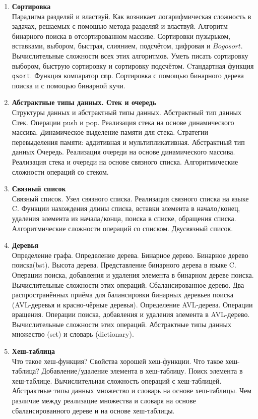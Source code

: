 \documentclass{article}
\begin{document}
\begin{enumerate}
\item \textbf{Сортировка}\\
Парадигма разделяй и властвуй. Как возникает логарифмическая сложность в задачах, решаемых с помощью метода разделяй и властвуй. Алгоритм бинарного поиска в отсортированном массиве.
Сортировки пузырьком, вставками, выбором, быстрая, слиянием, подсчётом, цифровая и $Bogosort$. Вычислительные сложности всех этих алгоритмов. Уметь писать сортировку выбором, быструю сортировку и сортировку подсчётом. Cтандартная функция \texttt{qsort}. Функция компаратор \texttt{cmp}. Сортировка с помощью бинарного дерева поиска и с помощью бинарной кучи.


\item  \textbf{Абстрактные типы данных. Стек и очередь}\\
Структуры данных и абстрактный типы данных. Абстрактный тип данных Стек. Операции push и pop. Реализация стека на основе динамического массива. Динамическое выделение памяти для стека. Стратегии перевыделения памяти: аддитивная и мультипликативная. Абстрактный тип данных Очередь. Реализация очереди на основе динамического массива. Реализация стека и очереди на основе связного списка. Алгоритмические сложности операций со стеком.

\item \textbf{Связный список}\\
Связный список. Узел связного списка. Реализация связного списка на языке C. Функции нахождения длины списка, вставки элемента в начало/конец, удаления элемента из начала/конца, поиска в списке, обращения списка. Алгоритмические сложности операций со списком. Двусвязный список.


\item \textbf{Деревья}\\
Определение графа. Определение дерева. Бинарное дерево. Бинарное дерево поиска(bst). Высота дерева. Представление бинарного дерева в языке C. Операции поиска, добавления и удаления элемента в бинарном дереве поиска. Вычислительные сложности этих операций. Сбалансированное дерево. Два распространённых приёма для балансировки бинарных деревьев поиска (AVL-деревья и красно-чёрные деревья). Определение AVL-дерева. Операции вращения. Операции поиска, добавления и удаления элемента в AVL-дерево. Вычислительные сложности этих операций. Абстрактные типы данных множество (set) и словарь (dictionary).


\item \textbf{Хеш-таблица}\\
Что такое хеш-функция? Свойства хорошей хеш-функции. Что такое хеш-таблица? Добавление/удаление элемента в хеш-таблицу. Поиск элемента в хеш-таблице. Вычислительная сложность операций с хеш-таблицей. Абстрактные типы данных множество и словарь на основе хеш-таблицы. Чем различие между реализацие множества и словаря на основе сбалансированного дереве и на основе хеш-таблицы.


\end{enumerate}
\end{document}
